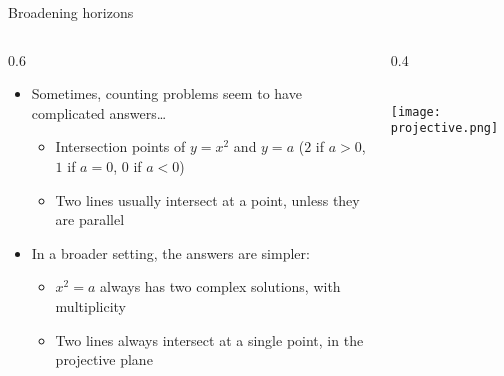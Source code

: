 \documentclass{beamer}
\theoremstyle{definition}
\begin{document}
                                                \begin{frame}{Broadening horizons}

      \begin{columns}[c]
        \begin{column}{0.6\hsize}
      
          \begin{itemize}
          \item Sometimes, counting problems seem to have complicated answers\dots
            \begin{itemize}
            \item Intersection points of $y = x^2$ and $y=a$ ($2$ if $a>0$,
              $1$ if $a=0$, $0$ if $a<0$)
              \item Two lines usually intersect at a point, unless they are parallel
            \end{itemize}
          \item In a broader setting, the answers are simpler:
            \begin{itemize}
            \item $x^2=a$ always has two complex solutions, with multiplicity
            \item Two lines always intersect at a single point, in the
              projective plane
              \end{itemize}
          \end{itemize}
        \end{column}
        \begin{column}{0.4\hsize}


          ~\\
          \texttt{[image: projective.png]}

        \end{column}
      \end{columns}
                                                \end{frame}
\end{document}
